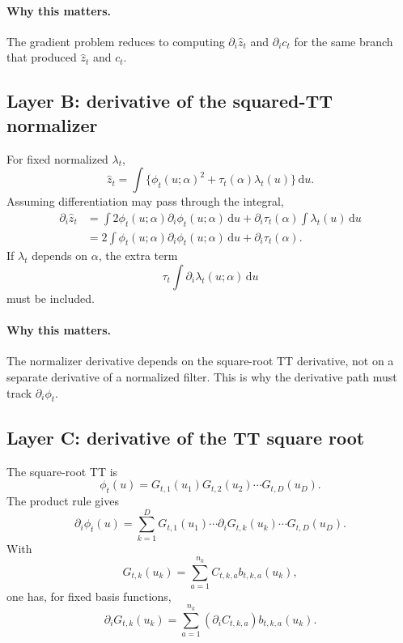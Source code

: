 \documentclass[11pt]{article}
\newcommand{\dd}{\mathrm{d}}
\renewcommand{\[}{\begin{equation}}
\renewcommand{\]}{\end{equation}}
\theoremstyle{definition}
\theoremstyle{remark}
\begin{document}
\paragraph{Why this matters.}
The gradient problem reduces to computing \(\partial_i\widehat z_t\) and
\(\partial_i c_t\) for the same branch that produced \(\widehat z_t\) and
\(c_t\).

\subsection*{Layer B: derivative of the squared-TT normalizer}

For fixed normalized \(\lambda_t\),
\[
  \widehat z_t
  =
  \int\{\phi_t(u;\alpha)^2+\tau_t(\alpha)\lambda_t(u)\}\,\dd u.
  \label{eq:p14-z-layerB}
\]
Assuming differentiation may pass through the integral,
\[
\begin{aligned}
  \partial_i\widehat z_t
  &=
  \int
  2\phi_t(u;\alpha)\partial_i\phi_t(u;\alpha)\,\dd u
  +
  \partial_i\tau_t(\alpha)\int\lambda_t(u)\,\dd u \\
  &=
  2\int
  \phi_t(u;\alpha)\partial_i\phi_t(u;\alpha)\,\dd u
  +
  \partial_i\tau_t(\alpha).
\end{aligned}
  \label{eq:p14-layerB}
\]
If \(\lambda_t\) depends on \(\alpha\), the extra term
\[
  \tau_t\int\partial_i\lambda_t(u;\alpha)\,\dd u
  \label{eq:p14-lambda-extra}
\]
must be included.

\paragraph{Why this matters.}
The normalizer derivative depends on the square-root TT derivative, not on a
separate derivative of a normalized filter.  This is why the derivative path
must track \(\partial_i\phi_t\).

\subsection*{Layer C: derivative of the TT square root}

The square-root TT is
\[
  \phi_t(u)
  =
  G_{t,1}(u_1)G_{t,2}(u_2)\cdots G_{t,D}(u_D).
  \label{eq:p14-layerC-tt}
\]
The product rule gives
\[
  \partial_i\phi_t(u)
  =
  \sum_{k=1}^D
  G_{t,1}(u_1)\cdots
  \partial_iG_{t,k}(u_k)\cdots
  G_{t,D}(u_D).
  \label{eq:p14-layerC-product}
\]
With
\[
  G_{t,k}(u_k)
  =
  \sum_{a=1}^{n_k} C_{t,k,a}b_{t,k,a}(u_k),
  \label{eq:p14-layerC-core}
\]
one has, for fixed basis functions,
\[
  \partial_iG_{t,k}(u_k)
  =
  \sum_{a=1}^{n_k}
  (\partial_iC_{t,k,a})b_{t,k,a}(u_k).
  \label{eq:p14-layerC-coredot}
\]
\end{document}
